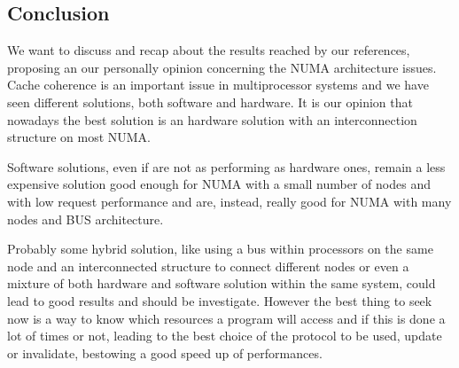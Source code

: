 \documentclass[a4paper,10pt]{article}
\begin{document}
\begin{multicols}{2}
\section{Conclusion}
We want to discuss and recap about the results reached by our references, proposing an our personally opinion concerning the NUMA architecture issues.
Cache coherence is an important issue in multiprocessor systems and we have seen different solutions, both software and hardware. It is our opinion that nowadays the best solution is an hardware solution with an interconnection structure on most NUMA.

Software solutions, even if are not as performing as hardware ones, remain a less expensive solution good enough for NUMA with a small number of nodes and with low request performance and are, instead, really good for NUMA with many nodes and BUS architecture.

Probably some hybrid solution, like using a bus within processors on the same node and an interconnected structure to connect different nodes or even a mixture of both hardware and software solution within the same system, could lead to good results and should be investigate.
However the best thing to seek now is a way to know which resources a program will access and if this is done a lot of times or not, leading to the best choice of the protocol to be used, update or invalidate, bestowing a good speed up of performances.




\end{multicols}
\end{document}
